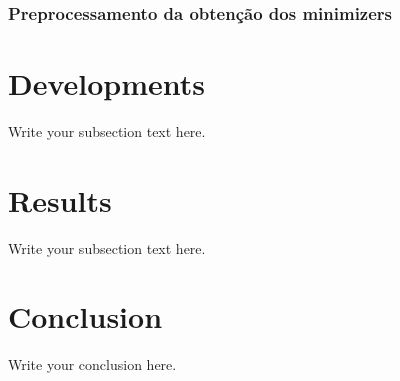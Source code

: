 \documentclass{article}
\begin{document}
\subsubsection{Preprocessamento da obtenção dos minimizers}
\section{Developments}
Write your subsection text here.

\section{Results}
Write your subsection text here.

\section{Conclusion}
Write your conclusion here.
\end{document}
